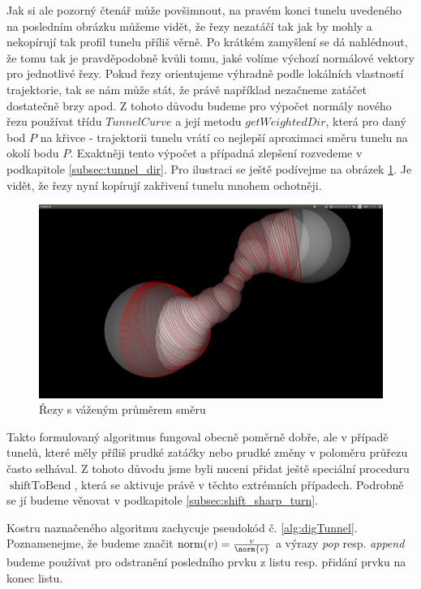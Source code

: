 Jak si ale pozorný čtenář může povšimnout, na pravém konci tunelu uvedeného na
posledním obrázku můžeme vidět, že řezy nezatáčí tak jak by mohly a nekopírují tak
profil tunelu příliš věrně. Po krátkém zamyšlení se dá nahlédnout, že tomu tak
je pravděpodobně kvůli tomu, jaké volíme výchozí normálové vektory pro jednotlivé
řezy. Pokud řezy orientujeme výhradně podle lokálních vlastností trajektorie,
tak se nám může stát, že právě například nezačneme zatáčet dostatečně brzy apod.
Z tohoto důvodu budeme pro výpočet normály nového řezu používat třídu
$ TunnelCurve $ a její metodu $ getWeightedDir $, která pro daný bod $ P $ na křivce
- trajektorii tunelu vrátí co nejlepší aproximaci směru tunelu na okolí bodu $ P $.
Exaktněji tento výpočet a případná zlepšení rozvedeme v podkapitole \ref{subsec:tunnel_dir}.
Pro ilustraci se ještě podívejme na obrázek \ref{fig:weighted_dir}. Je vidět, že
řezy nyní kopírují zakřivení tunelu mnohem ochotněji.

\begin{figure}[ht]
    \centering
    \includegraphics[width=\textwidth]{img/weighted_dir.png}
    \caption{Řezy s váženým průměrem směru}
  \centering
  \label{fig:weighted_dir}
\end{figure}

Takto formulovaný algoritmus fungoval obecně poměrně dobře, ale v případě tunelů,
které měly příliš prudké zatáčky nebo prudké změny v poloměru průřezu často
selhával. Z tohoto důvodu jsme byli nuceni přidat ještě speciální proceduru
$ \operatorname{shiftToBend} $, která se aktivuje právě v těchto extrémních
případech. Podrobně se jí budeme věnovat v podkapitole \ref{subsec:shift_sharp_turn}.

Kostru naznačeného algoritmu zachycuje pseudokód č. \ref{alg:digTunnel}.
Poznamenejme, že budeme značit $ \operatorname{norm}(v) = \frac{v}{\norm{v}}$ a
výrazy \textit{pop} resp. \textit{append} budeme používat pro odstranění posledního prvku z listu resp.
přidání prvku na konec listu.


